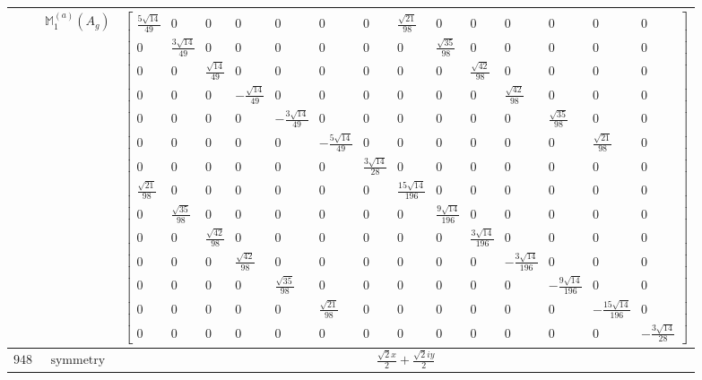 \documentclass[fleqn,8pt,landscape]{jsarticle}
\begin{document}
\begin{longtable}{ccc}
$  $ & $ \mathbb{M}_{1}^{(a)}(A_{g}) $ & $ \begin{bmatrix} \frac{5 \sqrt{14}}{49} & 0 & 0 & 0 & 0 & 0 & 0 & \frac{\sqrt{21}}{98} & 0 & 0 & 0 & 0 & 0 & 0 \\ 0 & \frac{3 \sqrt{14}}{49} & 0 & 0 & 0 & 0 & 0 & 0 & \frac{\sqrt{35}}{98} & 0 & 0 & 0 & 0 & 0 \\ 0 & 0 & \frac{\sqrt{14}}{49} & 0 & 0 & 0 & 0 & 0 & 0 & \frac{\sqrt{42}}{98} & 0 & 0 & 0 & 0 \\ 0 & 0 & 0 & - \frac{\sqrt{14}}{49} & 0 & 0 & 0 & 0 & 0 & 0 & \frac{\sqrt{42}}{98} & 0 & 0 & 0 \\ 0 & 0 & 0 & 0 & - \frac{3 \sqrt{14}}{49} & 0 & 0 & 0 & 0 & 0 & 0 & \frac{\sqrt{35}}{98} & 0 & 0 \\ 0 & 0 & 0 & 0 & 0 & - \frac{5 \sqrt{14}}{49} & 0 & 0 & 0 & 0 & 0 & 0 & \frac{\sqrt{21}}{98} & 0 \\ 0 & 0 & 0 & 0 & 0 & 0 & \frac{3 \sqrt{14}}{28} & 0 & 0 & 0 & 0 & 0 & 0 & 0 \\ \frac{\sqrt{21}}{98} & 0 & 0 & 0 & 0 & 0 & 0 & \frac{15 \sqrt{14}}{196} & 0 & 0 & 0 & 0 & 0 & 0 \\ 0 & \frac{\sqrt{35}}{98} & 0 & 0 & 0 & 0 & 0 & 0 & \frac{9 \sqrt{14}}{196} & 0 & 0 & 0 & 0 & 0 \\ 0 & 0 & \frac{\sqrt{42}}{98} & 0 & 0 & 0 & 0 & 0 & 0 & \frac{3 \sqrt{14}}{196} & 0 & 0 & 0 & 0 \\ 0 & 0 & 0 & \frac{\sqrt{42}}{98} & 0 & 0 & 0 & 0 & 0 & 0 & - \frac{3 \sqrt{14}}{196} & 0 & 0 & 0 \\ 0 & 0 & 0 & 0 & \frac{\sqrt{35}}{98} & 0 & 0 & 0 & 0 & 0 & 0 & - \frac{9 \sqrt{14}}{196} & 0 & 0 \\ 0 & 0 & 0 & 0 & 0 & \frac{\sqrt{21}}{98} & 0 & 0 & 0 & 0 & 0 & 0 & - \frac{15 \sqrt{14}}{196} & 0 \\ 0 & 0 & 0 & 0 & 0 & 0 & 0 & 0 & 0 & 0 & 0 & 0 & 0 & - \frac{3 \sqrt{14}}{28} \end{bmatrix} $ \\ \hline
$ 948 $ & $ \text{symmetry} $ & $ \frac{\sqrt{2} x}{2} + \frac{\sqrt{2} i y}{2} $ \\

\end{longtable}
\end{document}
